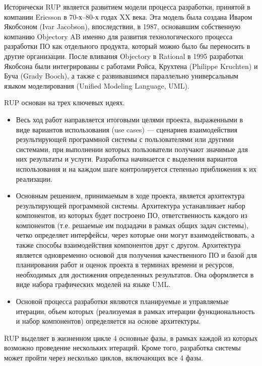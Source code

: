 \documentclass{../../text-style}
\begin{document}
Исторически RUP является развитием модели процесса разработки, принятой в компании Ericsson в 70-х–80-х годах XX века. Эта модель была создана Иваром Якобсоном (Ivar Jacobson), впоследствии, в 1987, основавшим собственную компанию Objectory AB именно для развития технологического процесса разработки ПО как отдельного продукта, который можно было бы переносить в другие организации. После вливания Objectory в Rational в 1995 разработки Якобсона были интегрированы с работами Ройса, Крухтена (Philippe Kruchten) и Буча (Grady Booch), а также с развивавшимся параллельно универсальным языком моделирования (Unified Modeling Language, UML).

RUP основан на трех ключевых идеях.

\begin{itemize}
    \item Весь ход работ направляется итоговыми целями проекта, выраженными в виде вариантов использования (use cases) --- сценариев взаимодействия результирующей программной системы с пользователями или другими системами, при выполнении которых пользователи получают значимые для них результаты и услуги. Разработка начинается с выделения вариантов использования и на каждом шаге контролируется степенью приближения к их реализации.
    \item Основным решением, принимаемым в ходе проекта, является архитектура результирующей программной системы. Архитектура устанавливает набор компонентов, из которых будет построено ПО, ответственность каждого из компонентов (т.е. решаемые им подзадачи в рамках общих задач системы), четко определяет интерфейсы, через которые они могут взаимодействовать, а также способы взаимодействия компонентов друг с другом. Архитектура является одновременно основой для получения качественного ПО и базой для планирования работ и оценок проекта в терминах времени и ресурсов, необходимых для достижения определенных результатов. Она оформляется в виде набора графических моделей на языке UML.
    \item Основой процесса разработки являются планируемые и управляемые итерации, объем которых (реализуемая в рамках итерации функциональность и набор компонентов) определяется на основе архитектуры.
\end{itemize}

RUP выделяет в жизненном цикле 4 основные фазы, в рамках каждой из которых возможно проведение нескольких итераций. Кроме того, разработка системы может пройти через несколько циклов, включающих все 4 фазы.
\end{document}
